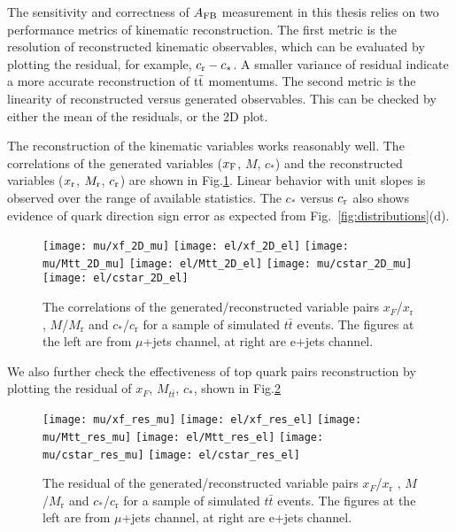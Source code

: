 The sensitivity and correctness of $A_{\mathrm{FB}}$ measurement in this thesis relies on two performance metrics of kinematic reconstruction. The first metric is the resolution of reconstructed kinematic observables, which can be evaluated by plotting the residual, for example, $c_\mathrm{r} - c_*$. A smaller variance of residual indicate a more accurate reconstruction of $\mathrm{t}\bar{\mathrm{t}}$ momentums. The second metric is the linearity of reconstructed versus generated observables. This can be checked by either the mean of the residuals, or the 2D plot.  

The reconstruction of the kinematic variables works reasonably well.  The correlations of the generated variables ($x_\mathrm{F}$, $M$, $c_*$) and the reconstructed variables ($x_\mathrm{r}$, $M_\mathrm{r}$, $c_\mathrm{r}$) are shown in Fig.\ref{fig:cost_reco}.  Linear behavior with unit slopes is observed over the range of available statistics.  The $c_*$ versus $c_\mathrm{r}$ also shows evidence of quark direction sign error as expected from Fig.~\ref{fig:distributions}(d).  

\begin{figure}[hbt]
  \begin{center}
    \texttt{[image: mu/xf\_2D\_mu]}
    \texttt{[image: el/xf\_2D\_el]}   
    \texttt{[image: mu/Mtt\_2D\_mu]}
    \texttt{[image: el/Mtt\_2D\_el]}
    \texttt{[image: mu/cstar\_2D\_mu]}
    \texttt{[image: el/cstar\_2D\_el]}
  \caption{\small The correlations of the generated/reconstructed variable pairs $x_F$/$x_\mathrm{r}$ , $M$/$M_\mathrm{r}$ and $c_*$/$c_\mathrm{r}$ for a sample of simulated $t\bar t$ events. The figures at the left are from $\mu$+jets channel, at right are e+jets channel.}
    \label{fig:cost_reco}
  \end{center}
\end{figure}

We also further check the effectiveness of top quark pairs reconstruction by plotting the residual of $x_F$, $M_{t\bar{t}}$, $c_*$, shown in Fig.\ref{fig:reco_res}
\begin{figure}[hbt]
  \begin{center}
    \texttt{[image: mu/xf\_res\_mu]}
    \texttt{[image: el/xf\_res\_el]}   
    \texttt{[image: mu/Mtt\_res\_mu]}
    \texttt{[image: el/Mtt\_res\_el]}
    \texttt{[image: mu/cstar\_res\_mu]}
    \texttt{[image: el/cstar\_res\_el]}
  \caption{\small The residual of the generated/reconstructed variable pairs $x_F$/$x_\mathrm{r}$ , $M$/$M_\mathrm{r}$ and $c_*$/$c_\mathrm{r}$ for a sample of simulated $t\bar t$ events. The figures at the left are from $\mu$+jets channel, at right are e+jets channel.}
    \label{fig:reco_res}
  \end{center}
\end{figure}


